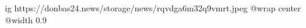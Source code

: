  
 
 
 
 

\ifcmt
  ig https://donbas24.news/storage/news/rqvdga6m32q9vmrt.jpeg
  @wrap center
  @width 0.9
\fi
